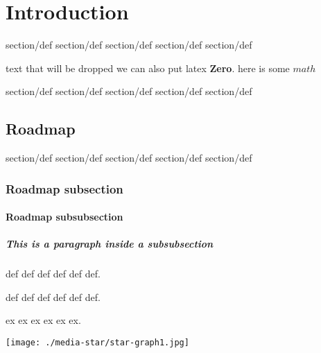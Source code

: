 \chapter{Introduction}
\label{ch:intro}

\begin{definition}


section/def section/def section/def
section/def section/def
\end{definition}

text that will be dropped we can also put latex  \textbf{Zero}.
here is some $math$

\begin{definition}
section/def section/def section/def
section/def section/def
\end{definition}



\section{Roadmap}
\label{sec:roadmap}



\begin{definition}
\label{def:one}
section/def section/def section/def
section/def section/def
\end{definition}



\subsection{Roadmap subsection}

\subsubsection{Roadmap subsubsection}
\paragraph{This is a paragraph inside a subsubsection}

\begin{definition}
\label{def:title}
  def def def
  def
  def def.
\end{definition}



\begin{group}
  
\begin{definition}
\label{def:title}
  def def def
  def
  def def.
\end{definition}



\begin{example}
\label{ex:title}
  ex ex ex
  ex
  ex ex.
  \begin{center}
  \texttt{[image: ./media-star/star-graph1.jpg]}
  \end{center}
\end{example}
\end{group}
